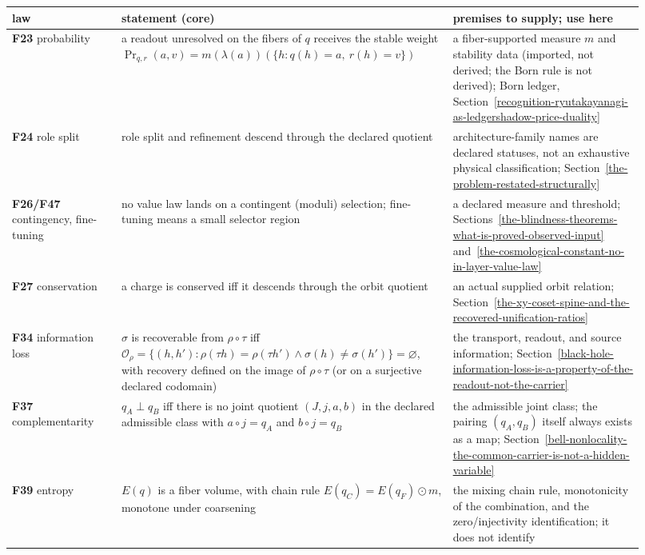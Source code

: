 \begin{center}
\small
\begin{longtable}[]{@{}p{0.16\linewidth}p{0.48\linewidth}p{0.28\linewidth}@{}}
\toprule
law & statement (core) & premises to supply; use here\\
\midrule
\endhead
\textbf{F23} probability & a readout unresolved on the fibers of \(q\) receives the stable weight
\(\Pr_{q,r}(a,v)=m(\lambda(a))(\{h: q(h)=a,\ r(h)=v\})\) & a fiber-supported measure \(m\) and stability data
(imported, not derived; the Born rule is not derived); Born ledger, Section~\ref{recognition-ryutakayanagi-as-ledgershadow-price-duality}\\
\textbf{F24} role split & role split and refinement descend through the declared quotient & architecture-family names
are declared statuses, not an exhaustive physical classification; Section~\ref{the-problem-restated-structurally}\\
\textbf{F26/F47} contingency, fine-tuning & no value law lands on a contingent (moduli) selection; fine-tuning means a
small selector region & a declared measure and threshold; Sections~\ref{the-blindness-theorems-what-is-proved-observed-input}
and~\ref{the-cosmological-constant-no-in-layer-value-law}\\
\textbf{F27} conservation & a charge is conserved iff it descends through the orbit quotient & an actual supplied orbit
relation; Section~\ref{the-xy-coset-spine-and-the-recovered-unification-ratios}\\
\textbf{F34} information loss & \(\sigma\) is recoverable from \(\rho\circ\tau\) iff
\(\mathcal O_\rho=\{(h,h'):\rho(\tau h)=\rho(\tau h') \wedge \sigma(h)\neq\sigma(h')\}=\varnothing\), with recovery
defined on the image of \(\rho\circ\tau\) (or on a surjective declared codomain) & the transport, readout, and source
information; Section~\ref{black-hole-information-loss-is-a-property-of-the-readout-not-the-carrier}\\
\textbf{F37} complementarity & \(q_A\perp q_B\) iff there is no joint quotient \((J,j,a,b)\) in the declared admissible
class with \(a\circ j=q_A\) and \(b\circ j=q_B\) & the admissible joint class; the pairing \((q_A,q_B)\) itself always
exists as a map; Section~\ref{bell-nonlocality-the-common-carrier-is-not-a-hidden-variable}\\
\textbf{F39} entropy & \(E(q)\) is a fiber volume, with chain rule \(E(q_C)=E(q_F)\odot m\), monotone under coarsening
& the mixing chain rule, monotonicity of the combination, and the zero/injectivity identification; it does not identify

\end{longtable}
\end{center}
